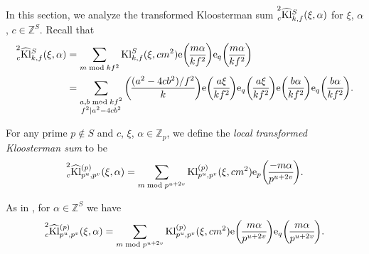 \documentclass[10pt,oneside,reqno]{amsart}
\newcommand\rme{\mathrm{e}}
\newcommand\ZZ{\mathbb{Z}}
\newcommand\Kl{\mathrm{Kl}}
\newcommand\legendresymbol[2]{\genfrac{(}{)}{}{}{#1}{#2}}
\theoremstyle{THEOREM}
\theoremstyle{DEFINITION}
\theoremstyle{EXERCISE}
\numberwithin{equation}{section}
\begin{document}
In this section, we analyze the transformed Kloosterman sum $\prescript{2}{c}{\widehat{\Kl}}_{k,f}^S(\xi,\alpha)$ for $\xi$, $\alpha$, $c\in \ZZ^S$. Recall that
\begin{align*}
\prescript{2}{c}{\widehat{\Kl}}_{k,f}^S(\xi,\alpha)&=\sum_{m \bmod kf^2}\Kl_{k,f}^S(\xi,cm^2)\rme\legendresymbol{m\alpha}{kf^2} \rme_q\legendresymbol{m\alpha}{kf^2}\\
&=\sum_{\substack{a,b \bmod kf^2\\f^2\mid a^2-4cb^2}}\legendresymbol{(a^2-4cb^2)/f^2}{k}\rme\legendresymbol{a\xi}{kf^2} \rme_q\legendresymbol{a\xi}{kf^2}\rme\legendresymbol{b\alpha}{kf^2} \rme_q\legendresymbol{b\alpha}{kf^2}.
\end{align*}

For any prime $p\notin S$ and $c$, $\xi$, $\alpha\in \ZZ_p$, we define the \emph{local transformed Kloosterman sum} to be
\begin{equation}\label{eq:deflocalkloostermancharacter}
\prescript{2}{c}{\widehat{\Kl}}_{p^u,p^v}^{(p)}(\xi,\alpha)=\sum_{m\bmod p^{u+2v}}\Kl_{p^u,p^v}^{(p)}(\xi,cm^2)\rme_p\legendresymbol{-m\alpha}{p^{u+2v}}.
\end{equation}

As in \cite[Section 4]{cheng2025c}, for $\alpha\in \ZZ^S$ we have
\begin{equation}\label{eq:localgeneralizedkloostermaneq2}
\prescript{2}{c}{\widehat{\Kl}}_{p^u,p^v}^{(p)}(\xi,\alpha)=
\sum_{m \bmod p^{u+2v}}\Kl_{p^u,p^v}^{(p)}(\xi,cm^2) \rme\legendresymbol{m\alpha}{p^{u+2v}}\rme_{q}\legendresymbol{m\alpha}{p^{u+2v}}.
\end{equation}
\end{document}
